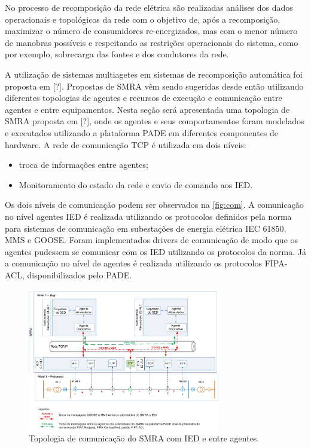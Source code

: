 \documentclass[journal]{IEEEtran}
\begin{document}
No processo de recomposição da rede elétrica são realizadas análises dos dados operacionais e topológicos da rede com o objetivo de, após a recomposição, maximizar o número de consumidores re-energizados, mas com o menor número de manobras possíveis e respeitando as restrições operacionais do sistema, como por exemplo, sobrecarga das fontes e dos condutores da rede.

A utilização de sistemas multiagetes em sistemas de recomposição automática foi proposta em [?]. Propostas de SMRA vêm sendo sugeridas desde então utilizando diferentes topologias de agentes e recursos de execução e comunicação entre agentes e entre equipamentos. Nesta seção será apresentada uma topologia de SMRA proposta em [?], onde os agentes e seus comportamentos foram modelados e executados utilizando a plataforma PADE em diferentes componentes de hardware. A rede de comunicação TCP é utilizada em dois níveis:

\begin{itemize}
  \item troca de informações entre agentes;
  \item Monitoramento do estado da rede e envio de comando aos IED.
\end{itemize}

Os dois níveis de comunicação podem ser observados na \autoref{fig:com}. A comunicação no nível agentes IED é realizada utilizando os protocolos definidos pela norma para sistemas de comunicação em subestações de energia elétrica IEC 61850, MMS e GOOSE. Foram implementados drivers de comunicação de modo que os agentes pudessem se comunicar com os IED utilizando os protocolos da norma. Já a comunicação no nível de agentes é realizada utilizando os protocolos FIPA-ACL, disponibilizados pelo PADE.  

\begin{figure}[htb]
  \centering
  \includegraphics[width=3.3in]{Figuras/agentes_ieds.jpg}
  \caption{\label{fig:com}Topologia de comunicação do SMRA com IED e entre agentes.}
\end{figure}
\end{document}
